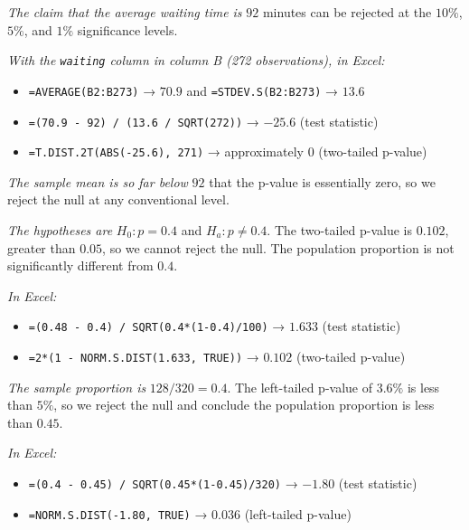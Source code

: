 \documentclass[
  11pt,
  letterpaper,
  DIV=11,
  numbers=noendperiod,
  oneside,
  open=any]{scrreprt}
\providecommand{\tightlist}{%
  \setlength{\itemsep}{0pt}\setlength{\parskip}{0pt}}\usepackage{longtable,booktabs,array}
\newenvironment{bsanswerkey}[2]{%
  \begin{tcolorbox}[bsbase, colback=bspaper2, colframe=bsline, fontupper=\small,
    title={\hypertarget{a-#1}{}\label{a-#1}\hyperlink{q-#1}{\textcolor{bsink2}{\MakeUppercase{#2}}}\hfill
      \hyperlink{q-#1}{\textcolor{bsaccent}{\normalfont\footnotesize back to page \pageref{q-#1}}}}]}%
  {\end{tcolorbox}}
\begin{document}
\begin{bsanswerkey}{bsans125}{Exercise 2}

\emph{The claim that the average waiting time is} \(92\) minutes can be
rejected at the \(10\%\), \(5\%\), and \(1\%\) significance levels.

\emph{With the \texttt{waiting} column in column B (272 observations),
in Excel:}

\begin{itemize}
\tightlist
\item
  \texttt{=AVERAGE(B2:B273)} → \(70.9\) and \texttt{=STDEV.S(B2:B273)} →
  \(13.6\)
\item
  \texttt{=(70.9\ -\ 92)\ /\ (13.6\ /\ SQRT(272))} → \(-25.6\) (test
  statistic)
\item
  \texttt{=T.DIST.2T(ABS(-25.6),\ 271)} → approximately \(0\)
  (two-tailed p-value)
\end{itemize}

\emph{The sample mean is so far below} \(92\) that the p-value is
essentially zero, so we reject the null at any conventional level.

\end{bsanswerkey}

\begin{bsanswerkey}{bsans126}{Exercise 3, question 1}

\emph{The hypotheses are} \(H_{0}: p = 0.4\) and \(H_{a}: p \neq 0.4\).
The two-tailed p-value is \(0.102\), greater than \(0.05\), so we cannot
reject the null. The population proportion is not significantly
different from \(0.4\).

\emph{In Excel:}

\begin{itemize}
\tightlist
\item
  \texttt{=(0.48\ -\ 0.4)\ /\ SQRT(0.4*(1-0.4)/100)} → \(1.633\) (test
  statistic)
\item
  \texttt{=2*(1\ -\ NORM.S.DIST(1.633,\ TRUE))} → \(0.102\) (two-tailed
  p-value)
\end{itemize}

\end{bsanswerkey}

\begin{bsanswerkey}{bsans127}{Exercise 3, question 2}

\emph{The sample proportion is} \(128/320 = 0.4\). The left-tailed
p-value of \(3.6\%\) is less than \(5\%\), so we reject the null and
conclude the population proportion is less than \(0.45\).

\emph{In Excel:}

\begin{itemize}
\tightlist
\item
  \texttt{=(0.4\ -\ 0.45)\ /\ SQRT(0.45*(1-0.45)/320)} → \(-1.80\) (test
  statistic)
\item
  \texttt{=NORM.S.DIST(-1.80,\ TRUE)} → \(0.036\) (left-tailed p-value)
\end{itemize}

\end{bsanswerkey}
\end{document}
